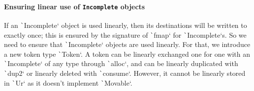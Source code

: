 \documentclass[english]{jflart}
\begin{document}



\paragraph{Ensuring linear use of \texttt{Incomplete} objects}

If an \texttt`Incomplete` object is used linearly, then its destinations will be written to exactly once; this is ensured by the signature of \texttt`fmap` for \texttt`Incomplete`s. So we need to ensure that \texttt`Incomplete` objects are used linearly. For that, we introduce a new token type \texttt`Token`. A token can be linearly exchanged one for one with an \texttt`Incomplete` of any type through \texttt`alloc`, and can be linearly duplicated with \texttt`dup2` or linearly deleted with \texttt`consume`. However, it cannot be linearly stored in \texttt`Ur` as it doesn't implement \texttt`Movable`.
\end{document}
